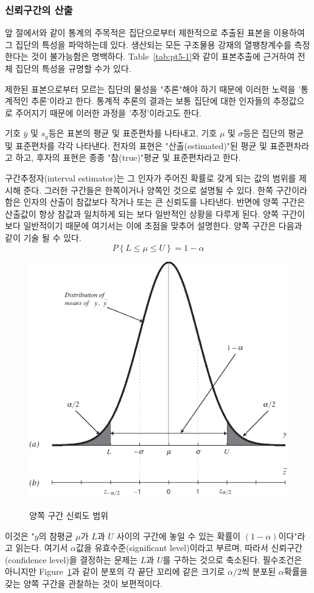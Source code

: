 \subsubsection{신뢰구간의 산출}
앞 절에서와 같이 통계의 주목적은 집단으로부터 제한적으로 추출된 표본을 이용하여 그 집단의 특성을 파악하는데 있다. 생산되는 모든 구조물용 강재의 열팽창계수를 측정한다는 것이 불가능함은 명백하다. Table~\ref{tab:pt5-1}와 같이 표본추출에 근거하여 전체 집단의 특성을 규명할 수가 있다.

제한된 표본으로부터 모르는 집단의 물성을 "추론"해야 하기 때문에 이러한 노력을 '통계적인 추론'이라고 한다. 통계적 추론의 결과는 보통 집단에 대한 인자들의 추정값으로 주어지기 때문에 이러한 과정을 '추정'이라고도 한다.

기호 $\bar{y}$ 및 $s_{y}$등은 표본의 평균 및 표준편차를 나타내고, 기호 $\mu$ 및 $\sigma$등은 집단의 평균 및 표준편차를 각각 나타낸다. 전자의 표현은 "산출(estimated)"된 평균 및 표준편차라고 하고, 후자의 표현은 종종 "참(true)"평균 및 표준편차라고 한다.

구간추정자(interval estimator)는 그 인자가 주어진 확률로 갖게 되는 값의 범위를 제시해 준다. 그러한 구간들은 한쪽이거나 양쪽인 것으로 설명될 수 있다. 한쪽 구간이라 함은 인자의 산출이 참값보다 작거나 또는 큰 신뢰도를 나타낸다. 반면에 양쪽 구간은 산출값이 항상 참값과 일치하게 되는 보다 일반적인 상황을 다루게 된다. 양쪽 구간이 보다 일반적이기 때문에 여기서는 이에 초점을 맞추어 설명한다.
양쪽 구간은 다음과 같이 기술 될 수 있다.
\begin{equation}
P\left\{L\leq\mu\leq U\right\}=1-\alpha
\end{equation}

\begin{figure}[!hbpt]
\centering
\includegraphics[keepaspectratio=true,width=0.6\linewidth]{MATLAB/chap11/norm.eps}
\label{fig:pt5-3}
\caption{양쪽 구간 신뢰도 범위}
\end{figure}
이것은 "$y$의 참평균 $\mu$가 $L$과 $U$ 사이의 구간에 놓일 수 있는 확률이 $(1-\alpha)$이다"라고 읽는다. 여기서 $\alpha$값을 유효수준(significant level)이라고 부르며, 따라서 신뢰구간 (confidence level)을 결정하는 문제는 $L$과 $U$를 구하는 것으로 축소된다. 필수조건은 아니지만 Figure~\ref{fig:pt5-3}과 같이 분포의 각 끝단 꼬리에 같은 크기로 $\alpha/2$씩 분포된 $\alpha$확률을 갖는 양쪽 구간을 관찰하는 것이 보편적이다.

